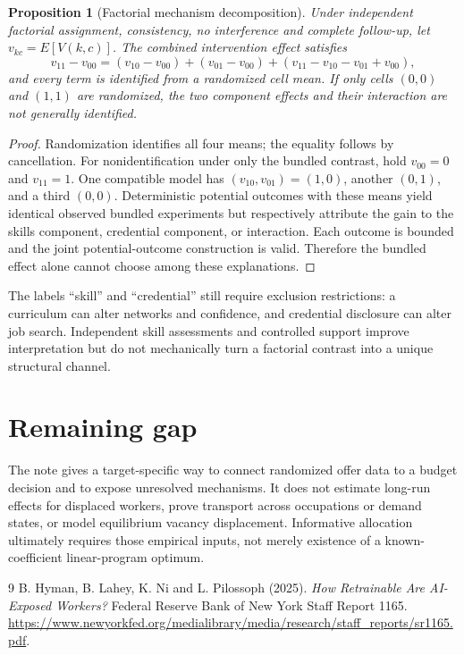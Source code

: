 \documentclass[11pt]{article}
\newtheorem{proposition}[theorem]{Proposition}
\theoremstyle{remark}
\begin{document}
\begin{proposition}[Factorial mechanism decomposition]
Under independent factorial assignment, consistency, no interference and complete follow-up, let $v_{kc}=E[V(k,c)]$. The combined intervention effect satisfies
\[
 v_{11}-v_{00}=(v_{10}-v_{00})+(v_{01}-v_{00})+
 (v_{11}-v_{10}-v_{01}+v_{00}),
\]
and every term is identified from a randomized cell mean. If only cells $(0,0)$ and $(1,1)$ are randomized, the two component effects and their interaction are not generally identified.
\end{proposition}
\begin{proof}
Randomization identifies all four means; the equality follows by cancellation. For nonidentification under only the bundled contrast, hold $v_{00}=0$ and $v_{11}=1$. One compatible model has $(v_{10},v_{01})=(1,0)$, another $(0,1)$, and a third $(0,0)$. Deterministic potential outcomes with these means yield identical observed bundled experiments but respectively attribute the gain to the skills component, credential component, or interaction. Each outcome is bounded and the joint potential-outcome construction is valid. Therefore the bundled effect alone cannot choose among these explanations.
\end{proof}
The labels ``skill'' and ``credential'' still require exclusion restrictions: a curriculum can alter networks and confidence, and credential disclosure can alter job search. Independent skill assessments and controlled support improve interpretation but do not mechanically turn a factorial contrast into a unique structural channel.

\section*{Remaining gap}
The note gives a target-specific way to connect randomized offer data to a budget decision and to expose unresolved mechanisms. It does not estimate long-run effects for displaced workers, prove transport across occupations or demand states, or model equilibrium vacancy displacement. Informative allocation ultimately requires those empirical inputs, not merely existence of a known-coefficient linear-program optimum.

\begin{thebibliography}{9}
 B. Hyman, B. Lahey, K. Ni and L. Pilossoph (2025). \emph{How Retrainable Are AI-Exposed Workers?} Federal Reserve Bank of New York Staff Report 1165. \url{https://www.newyorkfed.org/medialibrary/media/research/staff_reports/sr1165.pdf}.
\end{thebibliography}
\end{document}
